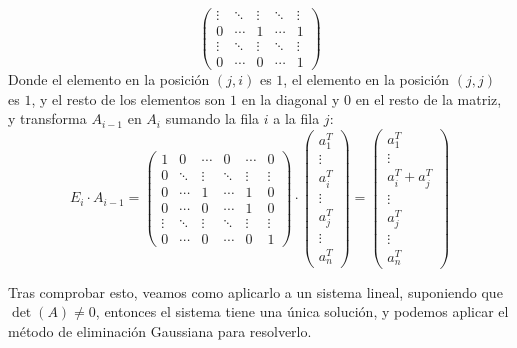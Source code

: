 \begin{proposición}
\begin{itemize}
\[\begin{pmatrix}
                \vdots & \ddots & \vdots & \ddots & \vdots 
                \\ 0 & \cdots & 1 & \cdots & 1
                \\ \vdots & \ddots & \vdots & \ddots & \vdots 
                \\ 0 & \cdots & 0 & \cdots & 1 
            \end{pmatrix}
        \]
        Donde el elemento en la posición $(j,i)$ es $1$, el elemento en la posición $(j,j)$ es $1$, y el resto de los elementos son $1$ en la diagonal y $0$ en el resto de la matriz, y transforma $A_{i-1}$ en $A_i$ sumando la fila $i$ a la fila $j$:
        \[
            E_i \cdot A_{i-1} =
            \begin{pmatrix}
                1 & 0 & \cdots & 0 & \cdots & 0 \\ 
                0 & \ddots & \vdots & \ddots & \vdots & \vdots 
                \\ 0 & \cdots & 1 & \cdots & 1 & 0 
                \\ 0 & \cdots & 0 & \cdots & 1 & 0 
                \\ \vdots & \ddots & \vdots & \ddots & \vdots & \vdots 
                \\ 0 & \cdots & 0 & \cdots & 0 & 1
            \end{pmatrix}
            \cdot
            \begin{pmatrix}
                a_1^T \\ \vdots \\ a_i^T \\ \vdots \\ a_j^T \\ \vdots \\ a_n^T
            \end{pmatrix} =
            \begin{pmatrix}
                a_1^T \\ \vdots \\ a_i^T + a_j^T \\ \vdots \\ a_j^T \\ \vdots \\ a_n^T
            \end{pmatrix}
        \]
    \end{itemize}
    
    Tras comprobar esto, veamos como aplicarlo a un sistema lineal, suponiendo que $\det(A) \neq 0$, entonces el sistema tiene una única solución, y podemos aplicar el método de eliminación Gaussiana para resolverlo.\\


\end{proposición}
